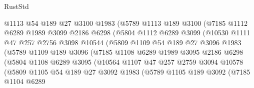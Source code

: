 \begin{lexlean}{RustStd}
\begin{coremodule}
                    @1113
                    @54
                    @189
                    @27
                    @3100
                    @1983
                    (@5789
                      @1113
                      @189
                      @3100
                      (@7185
                        @1112
                        @6289
                        @1989
                        @3099
                        @2186
                        @6298
                        (@5804
                          @1112
                          @6289
                          @3099
                          (@10530
                            @1111
                            @47
                            @257
                            @2756
                            @3098
                            @10544
                            (@5809
                              @1109
                              @54
                              @189
                              @27
                              @3096
                              @1983
                              (@5789
                                @1109
                                @189
                                @3096
                                (@7185
                                  @1108
                                  @6289
                                  @1989
                                  @3095
                                  @2186
                                  @6298
                                  (@5804
                                    @1108
                                    @6289
                                    @3095
                                    (@10564
                                      @1107
                                      @47
                                      @257
                                      @2759
                                      @3094
                                      @10578
                                      (@5809
                                        @1105
                                        @54
                                        @189
                                        @27
                                        @3092
                                        @1983
                                        (@5789
                                          @1105
                                          @189
                                          @3092
                                          (@7185
                                            @1104
                                            @6289

\end{coremodule}
\end{lexlean}
